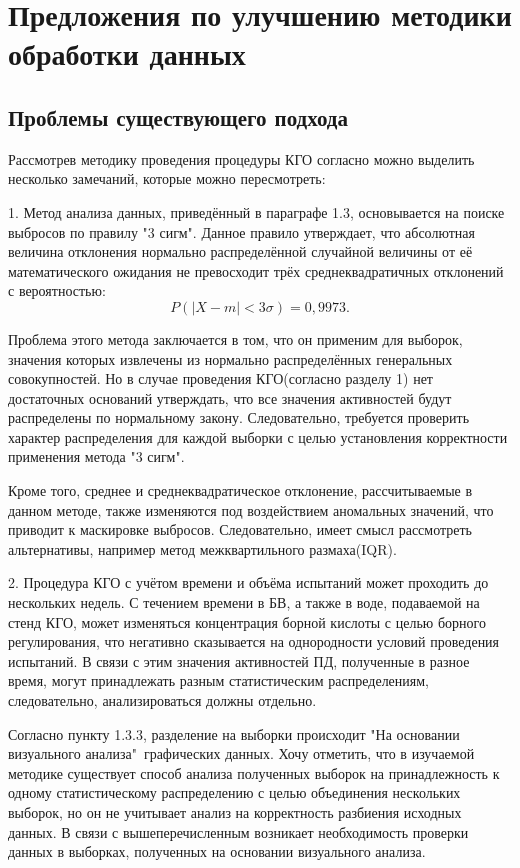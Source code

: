 \section{Предложения по улучшению методики обработки данных}

\subsection{Проблемы существующего подхода}
Рассмотрев методику проведения процедуры КГО согласно\cite{RD} можно выделить несколько замечаний, которые можно пересмотреть:

1. Метод анализа данных, приведённый в параграфе 1.3, основывается на поиске выбросов по правилу "3 сигм". Данное правило утверждает, что  абсолютная величина отклонения нормально распределённой случайной величины от её математического ожидания не превосходит трёх среднеквадратичных отклонений с вероятностью\cite{KremerMatstat}:
\begin{equation} \label{eq:3sigma_rule}
	P(|X - m| < 3\sigma)  = 0,9973.
\end{equation}

Проблема этого метода заключается в том, что он применим для выборок, значения которых извлечены из нормально распределённых генеральных совокупностей. Но в случае проведения КГО(согласно разделу 1) нет достаточных оснований утверждать, что все значения активностей будут распределены по нормальному закону. Следовательно, требуется проверить характер распределения для каждой выборки с целью установления корректности применения метода "3 сигм".

Кроме того, среднее и среднеквадратическое отклонение, рассчитываемые в данном методе, также изменяются под воздействием аномальных значений, что приводит к маскировке выбросов\cite{emissions}. Следовательно, имеет смысл рассмотреть альтернативы, например метод межквартильного размаха(IQR).

2. Процедура КГО с учётом времени и объёма испытаний может проходить до нескольких недель. С течением времени в БВ, а также в воде, подаваемой на стенд КГО, может изменяться концентрация борной кислоты с целью борного регулирования, что негативно сказывается на однородности условий проведения испытаний. В связи с этим значения активностей ПД, полученные в разное время, могут принадлежать разным статистическим распределениям, следовательно, анализироваться должны отдельно. 

Согласно пункту 1.3.3, разделение на выборки происходит "На основании визуального анализа"\ графических данных. Хочу отметить, что в изучаемой методике существует способ анализа полученных выборок на принадлежность к одному статистическому распределению с целью объединения нескольких выборок, но он не учитывает анализ на корректность разбиения исходных данных. В связи с вышеперечисленным возникает необходимость проверки данных в выборках, полученных на основании визуального анализа.

